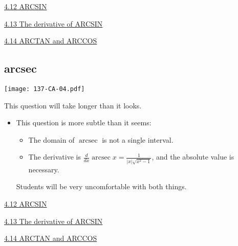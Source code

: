 \documentclass[11pt]{article}
\newcommand {\DS} [1] {${\displaystyle #1}$}
\newcommand{\nl}{\hfill \vspace{-1.1\baselineskip}} %
\newcommand{\vxii}{\hspace{8mm} \href{https://www.youtube.com/watch?v=V7cK2SQMizE&list=PLlwePzQY_wW-EDeUZebRoA8HGoeZxxpEU&index=12}{4.12 ARCSIN}}
\newcommand{\vxiii}{\hspace{8mm} \href{https://www.youtube.com/watch?v=kuKrSTOKw30&list=PLlwePzQY_wW-EDeUZebRoA8HGoeZxxpEU&index=13}{4.13 The derivative of ARCSIN}}
\newcommand{\vxiv}{\hspace{8mm} \href{https://www.youtube.com/watch?v=kANSILD9sn0&list=PLlwePzQY_wW-EDeUZebRoA8HGoeZxxpEU&index=14}{4.14 ARCTAN and ARCCOS}}
\newcommand{\arcsec}{\operatorname{arcsec}}
\begin{document}
\begin{videos}
\vxii

\vxiii

\vxiv
\end{videos}

\newpage
\subsection{arcsec} 

\begin{center}
{ \texttt{[image: 137-CA-04.pdf]}} 
\end{center}


\begin{warning}
This question will take longer than it looks.
\end{warning}

\begin{comments}
\nl
\begin{itemize}
	\item This question is more subtle than it seems:
		\begin{itemize}
			\item The domain of $\arcsec$ is not a single interval.
			\item The derivative is \DS{\frac{d}{dx} \arcsec x = \frac{1}{|x| \sqrt{x^2-1}}}, and the absolute value is necessary.
		\end{itemize}
		Students will be very uncomfortable with both things.
\end{itemize}	
\end{comments}

\begin{videos}
\vxii

\vxiii

\vxiv
\end{videos}

\newpage
\end{document}
